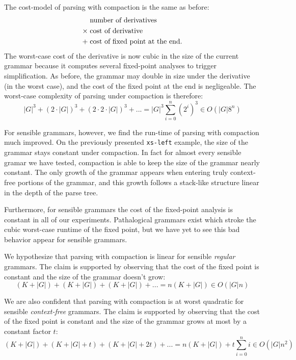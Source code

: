 The cost-model of parsing with compaction is the same as before:
\begin{align*}
  & \text{number of derivatives} 
 \\
 \times\; & \text{cost of derivative} 
 \\
 +\; & \text{cost of fixed point at the end}
 \text.
\end{align*}
%
The worst-case cost of the derivative is now cubic in the size of the current
grammar because it computes several fixed-point analyses to trigger
simplification.
%
As before, the grammar may double in size under the derivative (in the worst
case), and the cost of the fixed point at the end is negligeable.
%
The worst-case complexity of parsing under compaction is therefore:
%
\begin{equation*}
  |G|^3 + (2 \cdot |G|)^3 + (2 \cdot 2 \cdot |G|)^3 + ... = |G|^3 \sum_{i=0}^n (2^i)^3 \in O(|G|8^n)
\end{equation*}

For sensible grammars, however, we find the run-time of parsing with compaction much improved.
%
On the previously presented {\tt xs-left} example, the size of the grammar stays
constant under compaction.
%
In fact for almost every sensible gramar we have tested, compaction is able to
keep the size of the grammar nearly constant.
%
The only growth of the grammar appears when entering truly context-free portions of
the grammar, and this growth follows a stack-like structure linear in the depth of the parse tree.

Furthermore, for sensible grammars the cost of the fixed-point analysis is
constant in all of our experiments.
%
Pathalogical grammars exist which stroke the cubic worst-case runtime of the
fixed point, but we have yet to see this bad behavior appear for sensible
grammars.

We hypothesize that parsing with compaction is linear for sensible
\emph{regular} grammars.
%
The claim is supported by observing that the cost of the fixed point is constant
and the size of the grammar doesn't grow:
%
\begin{equation*}
  (K + |G|) + (K + |G|) + (K + |G|) + ... = n (K + |G|) \in O(|G| n)
\end{equation*}

We are also confident that parsing with compaction is at worst quadratic for
sensible \emph{context-free} grammars.
%
The claim is supported by observing that the cost of the fixed point is constant
and the size of the grammar grows at most by a constant factor $t$:
%
\begin{equation*}
  (K + |G|) + (K + |G| + t) + (K + |G| + 2t) + ... = n (K + |G|) + t \sum_{i=0}^n i \in O(|G| n^2)
\end{equation*}

